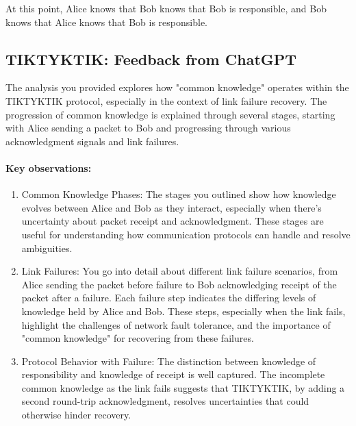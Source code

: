 \documentclass[../../../OAE-SPEC-MAIN.tex]{subfiles}
\begin{document}
At this point, Alice knows that Bob knows that Bob is responsible, and Bob knows that
Alice knows that Bob is responsible.

\begin{center}
\end{center}

\subsection{TIKTYKTIK: Feedback from ChatGPT}

The analysis you provided explores how "common knowledge" operates within the TIKTYKTIK protocol, especially in the context of link failure recovery. The progression of common knowledge is explained through several stages, starting with Alice sending a packet to Bob and progressing through various acknowledgment signals and link failures.

\paragraph{Key observations:}

\begin{enumerate}
\item Common Knowledge Phases: The stages you outlined show how knowledge evolves between Alice and Bob as they interact, especially when there’s uncertainty about packet receipt and acknowledgment. These stages are useful for understanding how communication protocols can handle and resolve ambiguities.

\item Link Failures: You go into detail about different link failure scenarios, from Alice sending the packet before failure to Bob acknowledging receipt of the packet after a failure. Each failure step indicates the differing levels of knowledge held by Alice and Bob. These steps, especially when the link fails, highlight the challenges of network fault tolerance, and the importance of "common knowledge" for recovering from these failures.

\item Protocol Behavior with Failure: The distinction between knowledge of responsibility and knowledge of receipt is well captured. The incomplete common knowledge as the link fails suggests that TIKTYKTIK, by adding a second round-trip acknowledgment, resolves uncertainties that could otherwise hinder recovery.

\end{enumerate}
\end{document}
